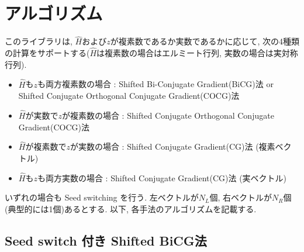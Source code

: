 \documentclass[12pt,titlepage]{jarticle}
\begin{document}
\section{アルゴリズム}

このライブラリは, ${\hat H}$および$z$が複素数であるか実数であるかに応じて,
次の4種類の計算をサポートする(${\hat H}$は複素数の場合はエルミート行列, 実数の場合は実対称行列).

\begin{itemize}
\item ${\hat H}$も$z$も両方複素数の場合 : Shifted Bi-Conjugate Gradient(BiCG)法 \cite{BiCG} or Shifted Conjugate Orthogonal Conjugate Gradient(COCG)法 \cite{COCG}
\item ${\hat H}$が実数で$z$が複素数の場合 : Shifted Conjugate Orthogonal Conjugate Gradient(COCG)法 \cite{COCG}
\item ${\hat H}$が複素数で$z$が実数の場合 : Shifted Conjugate Gradient(CG)法 (複素ベクトル)
\item ${\hat H}$も$z$も両方実数の場合 : Shifted Conjugate Gradient(CG)法 (実ベクトル)
\end{itemize}
いずれの場合も Seed switching を行う.
左ベクトルが$N_L$個, 右ベクトルが$N_R$個(典型的には1個)あるとする.
以下, 各手法のアルゴリズムを記載する.
\subsection{Seed switch 付き Shifted BiCG法}
\end{document}

